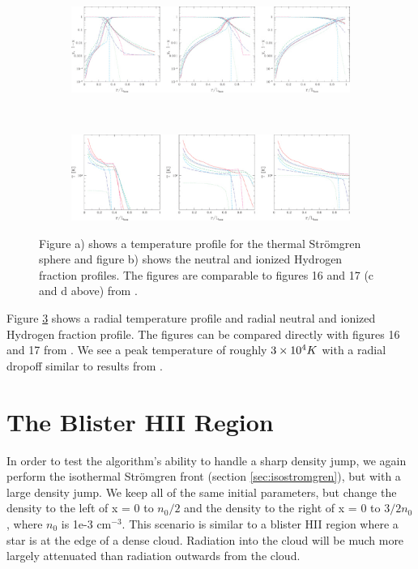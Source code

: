 \begin{figure}
        \\
        \begin{subfigure}[b]{0.45\textwidth}
                \includegraphics[width=\textwidth]{graphics/iliev06f16.eps}
                \caption{}
                \label{fig:ilievEtf16}
        \end{subfigure}
        ~ 
        \begin{subfigure}[b]{0.45\textwidth}
                \includegraphics[width=\textwidth]{graphics/iliev06f17.eps}
                \caption{}
                \label{fig:ilievEtf17}
        \end{subfigure}
        \caption[Temperature vs radius and HI vs radius for the thermal Str\"omgren sphere.]{Figure a) shows a temperature profile for the thermal Str\"omgren sphere and figure b) shows the neutral and ionized Hydrogen fraction profiles. The figures are comparable to figures 16 and 17 (c and d above) from \citet{ilievEt06}.}
        \label{fig:stromgrenthermal}
\end{figure}

Figure \ref{fig:stromgrenthermal} shows a radial temperature profile and radial neutral and ionized Hydrogen fraction profile. The figures can be compared directly with figures 16 and 17 from \citet{ilievEt06}. We see a peak temperature of roughly $3\times 10^{4} K$ with a radial dropoff similar to results from \citet{ilievEt06}.

\section{The Blister HII Region}
\label{sec:gaswall}

In order to test the algorithm's ability to handle a sharp density jump, we again perform the isothermal Str\"omgren front (section \ref{sec:isostromgren}), but with a large density jump. We keep all of the same initial parameters, but change the density to the left of x = 0 to $n_0/2$ and the density to the right of x = 0 to $3/2 n_0$, where $n_0$ is 1e-3 cm$^{-3}$. This scenario is similar to a blister HII region where a star is at the edge of a dense cloud. Radiation into the cloud will be much more largely attenuated than radiation outwards from the cloud.


